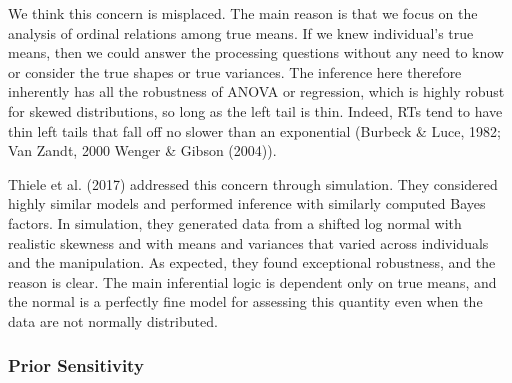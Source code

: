 \documentclass[english,man]{apa6}
\theoremstyle{definition}
\theoremstyle{definition}
\theoremstyle{remark}
\begin{document}
We think this concern is misplaced. The main reason is that we focus on
the analysis of ordinal relations among true means. If we knew
individual's true means, then we could answer the processing questions
without any need to know or consider the true shapes or true variances.
The inference here therefore inherently has all the robustness of ANOVA
or regression, which is highly robust for skewed distributions, so long
as the left tail is thin. Indeed, RTs tend to have thin left tails that
fall off no slower than an exponential (Burbeck \& Luce, 1982; Van
Zandt, 2000 Wenger \& Gibson (2004)).

Thiele et al. (2017) addressed this concern through simulation. They
considered highly similar models and performed inference with similarly
computed Bayes factors. In simulation, they generated data from a
shifted log normal with realistic skewness and with means and variances
that varied across individuals and the manipulation. As expected, they
found exceptional robustness, and the reason is clear. The main
inferential logic is dependent only on true means, and the normal is a
perfectly fine model for assessing this quantity even when the data are
not normally distributed.

\subsubsection{Prior Sensitivity}\label{prior-sensitivity}
\end{document}
